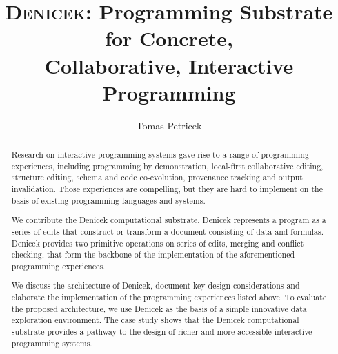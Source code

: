 \documentclass[sigconf]{acmart}
\begin{document}
\title[Denicek: Programming Substrate for Concrete, Collaborative, Interactive
  Programming]{{\scshape Denicek}: Programming Substrate for Concrete, \\Collaborative, Interactive Programming}

\author{Tomas Petricek}

\begin{abstract}
Research on interactive programming systems gave rise to a range of programming experiences,
including programming by demonstration, local-first collaborative editing, structure
editing, schema and code co-evolution, provenance tracking and output invalidation. Those
experiences are compelling, but they are hard to implement on the basis of existing programming
languages and systems.

We contribute the Denicek computational substrate. Denicek represents a program as a series of edits
that construct or transform a document consisting of data and formulas. Denicek provides two
primitive operations on series of edits, merging and conflict checking, that form the backbone
of the implementation of the aforementioned programming experiences.

We discuss the architecture of Denicek, document key design considerations and elaborate
the implementation of the programming experiences listed above. To evaluate the proposed
architecture, we use Denicek as the basis of a simple innovative data exploration environment.
The case study shows that the Denicek computational substrate provides a pathway to the design
of richer and more accessible interactive programming systems.
\end{abstract}


\maketitle
\end{document}
